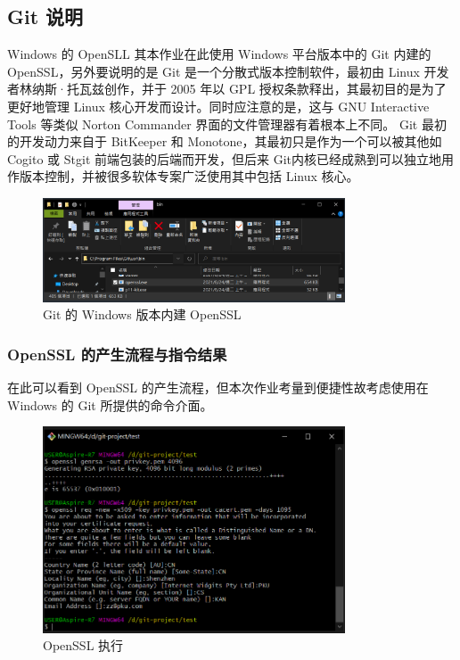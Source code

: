 \subsection{Git 说明}

Windows 的 OpenSLL 其本作业在此使用 Windows 平台版本中的 Git 内建的 OpenSSL，另外要说明的是 Git 是一个分散式版本控制软件，最初由 Linux 开发者林纳斯·托瓦兹创作，并于 2005 年以 GPL 授权条款释出，其最初目的是为了更好地管理 Linux 核心开发而设计。同时应注意的是，这与 GNU Interactive Tools 等类似 Norton Commander 界面的文件管理器有着根本上不同。 Git 最初的开发动力来自于 BitKeeper 和 Monotone，其最初只是作为一个可以被其他如 Cogito 或 Stgit 前端包装的后端而开发，但后来 Git内核已经成熟到可以独立地用作版本控制，并被很多软体专案广泛使用其中包括 Linux 核心。

\begin{figure}[htb]
\centering 
\includegraphics[width=0.80\textwidth]{img/ch1s2m2.png} 
\caption{Git 的 Windows 版本内建 OpenSSL}
\label{Test}
\end{figure}

\subsubsection{OpenSSL 的产生流程与指令结果}

在此可以看到 OpenSSL 的产生流程，但本次作业考量到便捷性故考虑使用在 Windows 的 Git 所提供的命令介面。

\begin{figure}[htb]
\centering 
\includegraphics[width=0.80\textwidth]{img/ch1s2m3.png} 
\caption{OpenSSL 执行}
\label{Test}
\end{figure}


